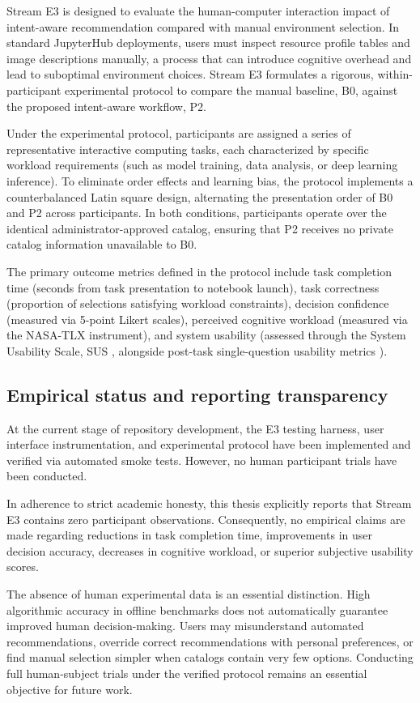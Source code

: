 Stream E3 is designed to evaluate the human-computer interaction impact of intent-aware recommendation compared with manual environment selection. In standard JupyterHub deployments, users must inspect resource profile tables and image descriptions manually, a process that can introduce cognitive overhead and lead to suboptimal environment choices. Stream E3 formulates a rigorous, within-participant experimental protocol to compare the manual baseline, B0, against the proposed intent-aware workflow, P2.

Under the experimental protocol, participants are assigned a series of representative interactive computing tasks, each characterized by specific workload requirements (such as model training, data analysis, or deep learning inference). To eliminate order effects and learning bias, the protocol implements a counterbalanced Latin square design, alternating the presentation order of B0 and P2 across participants. In both conditions, participants operate over the identical administrator-approved catalog, ensuring that P2 receives no private catalog information unavailable to B0.

The primary outcome metrics defined in the protocol include task completion time (seconds from task presentation to notebook launch), task correctness (proportion of selections satisfying workload constraints), decision confidence (measured via 5-point Likert scales), perceived cognitive workload (measured via the NASA-TLX instrument), and system usability (assessed through the System Usability Scale, SUS \cite{brooke}, alongside post-task single-question usability metrics \cite{sauro}).

\subsection{Empirical status and reporting transparency}
\label{subsec:e3_status}

At the current stage of repository development, the E3 testing harness, user interface instrumentation, and experimental protocol have been implemented and verified via automated smoke tests. However, no human participant trials have been conducted.

In adherence to strict academic honesty, this thesis explicitly reports that Stream E3 contains zero participant observations. Consequently, no empirical claims are made regarding reductions in task completion time, improvements in user decision accuracy, decreases in cognitive workload, or superior subjective usability scores.

The absence of human experimental data is an essential distinction. High algorithmic accuracy in offline benchmarks does not automatically guarantee improved human decision-making. Users may misunderstand automated recommendations, override correct recommendations with personal preferences, or find manual selection simpler when catalogs contain very few options. Conducting full human-subject trials under the verified protocol remains an essential objective for future work.